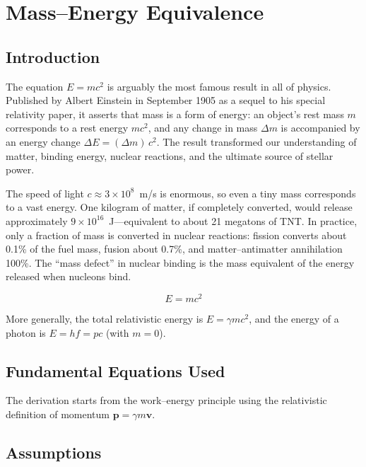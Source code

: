\chapter{Mass--Energy Equivalence}

\section*{Introduction}

The equation $E = mc^{2}$ is arguably the most famous result in all of physics. Published by Albert Einstein in September 1905 as a sequel to his special relativity paper, it asserts that mass is a form of energy: an object's rest mass $m$ corresponds to a rest energy $mc^{2}$, and any change in mass $\Delta m$ is accompanied by an energy change $\Delta E = (\Delta m)\,c^{2}$. The result transformed our understanding of matter, binding energy, nuclear reactions, and the ultimate source of stellar power.

The speed of light $c \approx 3 \times 10^{8}$~m/s is enormous, so even a tiny mass corresponds to a vast energy. One kilogram of matter, if completely converted, would release approximately $9 \times 10^{16}$~J---equivalent to about 21 megatons of TNT. In practice, only a fraction of mass is converted in nuclear reactions: fission converts about 0.1\% of the fuel mass, fusion about 0.7\%, and matter--antimatter annihilation 100\%. The ``mass defect'' in nuclear binding is the mass equivalent of the energy released when nucleons bind.


\begin{equation}
\boxed{\; E = mc^{2}\;}
\label{eq:mass-energy-einstein}
\end{equation}

More generally, the total relativistic energy is $E = \gamma mc^{2}$, and the energy of a photon is $E = hf = pc$ (with $m = 0$).

\section*{Fundamental Equations Used}

The derivation starts from the work--energy principle using the relativistic definition of momentum $\mathbf{p} = \gamma m\mathbf{v}$.

\section*{Assumptions}

